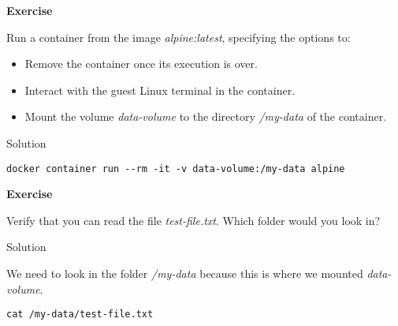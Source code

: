 \documentclass[
]{article}
\providecommand{\tightlist}{%
  \setlength{\itemsep}{0pt}\setlength{\parskip}{0pt}}
\newenvironment{infobox}[1]
  {
  \begin{itemize}
  \renewcommand{\labelitemi}{
    \raisebox{-.7\height}[0pt][0pt]{
      
    }
  }
  \setlength{\fboxsep}{1em}
  \begin{whitebox}
  \item
  }
  {
  \end{whitebox}
  \end{itemize}
  }
\theoremstyle{definition}
\theoremstyle{definition}
\theoremstyle{definition}
\theoremstyle{remark}
\let\BeginKnitrBlock\begin \let\EndKnitrBlock\end
\begin{document}
\begin{infobox}{exercisebox}

\textbf{Exercise}

\BeginKnitrBlock{exercise}
\protect\hypertarget{exr:unnamed-chunk-28}{}{\label{exr:unnamed-chunk-28} }Run a container from the image \emph{alpine:latest},
specifying the options to:

\begin{itemize}
\item
  Remove the container once its execution is over.
\item
  Interact with the guest Linux terminal in the container.
\end{itemize}

\begin{itemize}
\tightlist
\item
  Mount the volume \emph{data-volume} to the directory \emph{/my-data}
  of the container.
\end{itemize}
\EndKnitrBlock{exercise}

\end{infobox}

Solution

\begin{infobox}{exercisebox}

\begin{verbatim}
docker container run --rm -it -v data-volume:/my-data alpine
\end{verbatim}

\end{infobox}

\begin{infobox}{exercisebox}

\textbf{Exercise}

\BeginKnitrBlock{exercise}
\protect\hypertarget{exr:unnamed-chunk-29}{}{\label{exr:unnamed-chunk-29} }Verify that you can read the file \emph{test-file.txt}.
Which folder would you look in?
\EndKnitrBlock{exercise}

\end{infobox}

Solution

\begin{infobox}{exercisebox}

We need to look in the folder \emph{/my-data} because this is where
we mounted \emph{data-volume}.

\begin{verbatim}
cat /my-data/test-file.txt
\end{verbatim}

\end{infobox}
\end{document}
